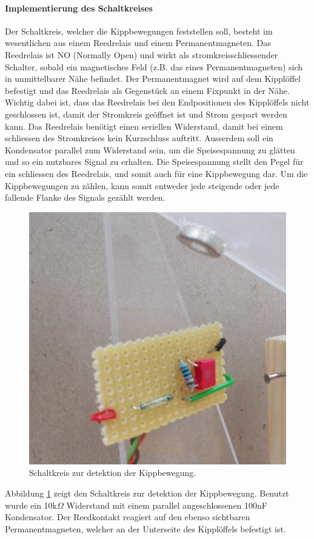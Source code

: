 \paragraph{\textbf{Implementierung des Schaltkreises}}
Der Schaltkreis, welcher die Kippbewegungen feststellen soll, besteht im wesentlichen aus einem Reedrelais und einem Permanentmagneten. Das Reedrelais ist NO (Normally Open) und wirkt als stromkreisschliessender Schalter, sobald ein magnetisches Feld (z.B. das eines Permanentmagneten) sich in unmittelbarer Nähe befindet. Der Permanentmagnet wird auf dem Kipplöffel befestigt und das Reedrelais als Gegenstück an einem Fixpunkt in der Nähe. Wichtig dabei ist, dass das Reedrelais bei den Endpositionen des Kipplöffels nicht geschlossen ist, damit der Stromkreis geöffnet ist und Strom gespart werden kann. Das Reedrelais benötigt einen seriellen Widerstand, damit bei einem schliessen des Stromkreises kein Kurzschluss auftritt. Ausserdem soll ein Kondensator parallel zum Widerstand sein, um die Speisespannung zu glätten und so ein nutzbares Signal zu erhalten. Die Speisespannung stellt den Pegel für ein schliessen des Reedrelais, und somit auch für eine Kippbewegung dar. Um die Kippbewegungen zu zählen, kann somit entweder jede steigende oder jede fallende Flanke des Signals gezählt werden.  

\begin{figure}[h]
\centering
\includegraphics[width=0.35\linewidth]{graphics/KippSchalt.jpg}
\caption{Schaltkreis zur detektion der Kippbewegung.}
\label{fig:KippSchalt}
\end{figure}

Abbildung \ref{fig:KippSchalt} zeigt den Schaltkreis zur detektion der Kippbewegung. Benutzt wurde ein 10k$\Omega$ Widerstand mit einem parallel angeschlossenen 100nF Kondensator. Der Reedkontakt reagiert auf den ebenso sichtbaren Permanentmagneten, welcher an der Unterseite des Kipplöffels befestigt ist.
\newpage
